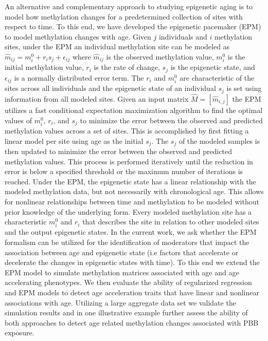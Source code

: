 \documentclass{article}
\begin{document}
{\begin{linenumbers}
An alternative and complementary approach to studying epigenetic aging is to model how methylation changes for a 
predetermined collection of sites with respect to time. To this end, we have developed the epigenetic pacemaker 
(EPM) \cite{Snir2016-dv,Farrell2020-ri} to model methylation changes with age. Given $j$ individuals and $i$ 
methylation sites, under the EPM an individual methylation site can be modeled as 
$\hat{m}_{ij} = m^0_i + r_is_j + \epsilon _{ij}$ where $\hat{m}_{ij}$ is the observed methylation value, 
$m^0_i$ is the initial methylation value, $r_i$ is the rate of change, $s_j$ is the epigenetic state, and 
$\epsilon _{ij}$ is a normally distributed error term. The $r_i$ and $m^0_i$ are characteristic of the sites 
across all individuals and the epigenetic state of an individual $s_j$ is set using information from all modeled 
sites. Given an input matrix $\hat M=[\hat  m_{i,j}]$ the EPM utilizes a fast conditional expectation maximization 
algorithm to find the optimal values of $m^0_i$, $r_i$, and $s_j$ to minimize the error between the observed 
and predicted methylation values across a set of sites. This is accomplished by first fitting a linear model 
per site using age as the initial $s_j$. The $s_j$ of the modeled samples is then updated to minimize the error 
between the observed and predicted methylation values. This process is performed iteratively until the reduction 
in error is below a specified threshold or the maximum number of iterations is reached. Under the EPM, the epigenetic 
state has a linear relationship with the modeled methylation data, but not necessarily with chronological age. This 
allows for nonlinear relationships between time and methylation to be modeled without prior knowledge of the underlying 
form. Every modeled methylation site has a characteristic $m^0_i$ and $r_i$ that describes the site in relation to 
other modeled sites and the output epigenetic states. In the current work, we ask whether the EPM formalism can be 
utilized for the identification of moderators that impact the association between age and epigenetic state 
(i.e factors that accelerate or decelerate the changes in epigenetic states with time).  To this end we extend the 
EPM model to simulate methylation matrices associated with age and age accelerating phenotypes. We then evaluate the 
ability of regularized regression and EPM models to detect age acceleration traits that have linear and nonlinear 
associations with age.  Utilizing a large aggregate data set we validate the simulation results and in one 
illustrative example further assess the ability of both approaches to detect age related methylation 
changes associated with PBB exposure.


\end{linenumbers}}
\end{document}
